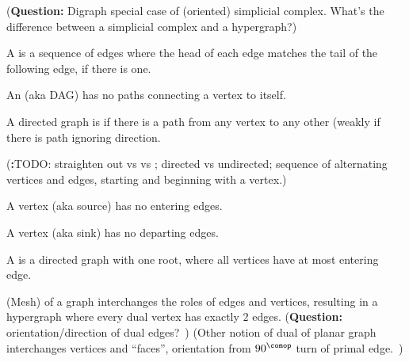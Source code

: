 \documentclass[11pt,openany]{book}
\let\oldfigure\figure%
\let\endoldfigure\endfigure%
\renewenvironment{figure}[1][htbp]%
  {\oldfigure[#1]\mdframed[backgroundcolor=GhostWhite,linecolor=GhostWhite]}
  {\endmdframed\endoldfigure}
\begin{document}
(\textbf{Question:} 
Digraph special case of (oriented) simplicial complex.
What's the difference between a simplicial complex 
and a hypergraph?)

A  is a sequence of edges where the head of each
edge matches the tail of the following edge, if there is one.

An  (aka DAG) has no paths
connecting a vertex to itself.

A directed graph is 
if there is a path
from any vertex to any other (weakly if there is path
ignoring direction.

(\textbf:{TODO:} straighten out  vs  vs
; directed vs undirected; sequence of alternating
vertices and edges, starting and beginning with a vertex.)

A  vertex (aka source) has no entering edges.

A  vertex (aka sink) has no departing edges.

A  is a directed graph with one root, 
where all vertices have at most entering edge.

(Mesh)  of a graph interchanges the roles of edges 
and vertices, resulting in a hypergraph where every dual vertex
has exactly $2$ edges. 
(\textbf{Question:} orientation/direction 
of dual edges?~\cite{Rusnak:2012:OrientedHyperGraphs})
(Other notion of dual of planar graph interchanges 
vertices and ``faces'',
orientation from $90^{\comop}$ 
turn of primal edge.~\cite{wiki:DualGraph})

\begin{figure}
\begin{mdframed}[backgroundcolor=GhostWhite,linecolor=GhostWhite]
\centering
{}
\caption{A directed (acyclic) graph}
\label{fig:a_digraph}
\end{mdframed}
\end{figure}
\end{document}
